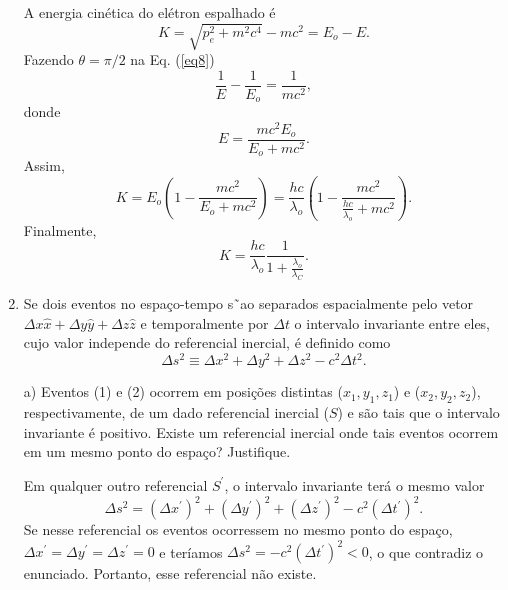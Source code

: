 \begin{enumerate}[start=1,label={\bfseries Q\arabic*.}]
\resposta A energia cinética do elétron espalhado é
%
\begin{equation}
  K = \sqrt{ p_{e}^{2} + m^{2}c^{4} } - m c^{2} = E_{o} - E .
\end{equation}
%
Fazendo $ \theta = \pi / 2 $ na Eq. (\ref{eq8})
%
\begin{equation}
  \frac{1}{E} - \frac{1}{E_{o}} = \frac{1}{mc^{2}} ,
\end{equation}
%
donde
%
\begin{equation}
  E = \frac{m c^{2} E_{o}}{E_{o} + m c^{2}} .
\end{equation}
%
Assim,
%
\begin{equation}
  K = E_{o} \left( 1 - \frac{m c^{2}}{E_{o} + m c^{2}}  \right) = \frac{hc}{\lambda_{o}} \left( 1 - \frac{m c^{2}}{ \frac{hc}{\lambda_{o}} + m c^{2} }    \right) .
\end{equation}
%
Finalmente,
%
\begin{equation}
  K = \frac{hc}{\lambda_{o}} \frac{1}{ 1 + \frac{\lambda_{o}}{\lambda_{C}} } .
\end{equation}
%





\item Se dois eventos no espaço-tempo s˜ao separados espacialmente pelo vetor $\Delta x \hat{x} + \Delta y \hat{y} + \Delta z \hat{z}$ e temporalmente por $\Delta t$ o intervalo invariante entre eles, cujo valor independe do referencial inercial, é definido como
%
\begin{equation}
  \Delta s^{2} \equiv \Delta x^{2} + \Delta y^{2} + \Delta z^{2} - c^{2} \Delta t^{2}.
\end{equation}


a) Eventos (1) e (2) ocorrem em posições distintas ($x_{1},y_{1},z_{1}$) e ($x_{2},y_{2},z_{2}$), respectivamente, de um dado referencial inercial ($S$) e são tais que o intervalo invariante é positivo. Existe um referencial inercial onde tais eventos ocorrem em um mesmo ponto do espaço? Justifique.

\resposta Em qualquer outro referencial $S^{\prime}$, o intervalo invariante terá o mesmo valor
%
\begin{equation}
  \Delta s^{2} = (\Delta x^{\prime})^{2} + (\Delta y^{\prime})^{2} + (\Delta z^{\prime})^{2} - c^{2} (\Delta t^{\prime})^{2}.
\end{equation}
%
Se nesse referencial os eventos ocorressem no mesmo ponto do espaço, $\Delta x^{\prime} = \Delta y^{\prime} = \Delta z^{\prime} = 0$ e teríamos $\Delta s^{2} = - c^{2} (\Delta t^{\prime})^{2} < 0$, o que contradiz o enunciado. Portanto, esse referencial não existe.




\end{enumerate}
